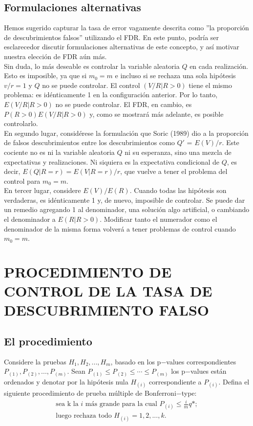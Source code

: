 \documentclass[11pt,letterpaper]{article}
\begin{document}
\subsection{Formulaciones alternativas} 
Hemos sugerido capturar la tasa de error vagamente descrita como ''la proporción de descubrimientos falsos'' utilizando el FDR. En este punto, podría ser esclarecedor discutir formulaciones alternativas de este concepto, y así motivar nuestra elección de FDR aún más.\\
Sin duda, lo más deseable es controlar la variable aleatoria $Q$ en cada realización. Esto es imposible, ya que si $m_0= m$ e incluso si se rechaza una sola hipótesis $v / r =1$ y $Q$ no se puede controlar. El control $(V / R|R> 0)$ tiene el mismo problema: es idénticamente 1 en la configuración anterior. Por lo tanto, $E(V / R|R> 0)$ no se puede controlar. El FDR, en cambio, es $P(R> 0)E (V / R|R> 0)$ y, como se mostrará más adelante, es posible controlarlo.\\
En segundo lugar, considérese la formulación que Soric (1989) dio a la proporción de falsos descubrimientos entre los descubrimientos como $Q'$ = $E (V) / r$. Este cociente no es ni la variable aleatoria $Q$ ni su esperanza, sino una mezcla de expectativas y realizaciones. Ni siquiera es la expectativa condicional de $Q$, es decir, $E(Q|R = r)=E(V|R = r) / r$, que vuelve a tener el problema del control para $m_0=m$.\\
En tercer lugar, considere $E (V) / E (R)$. Cuando todas las hipótesis son verdaderas, es idénticamente 1 y, de nuevo, imposible de controlar. Se puede dar un remedio agregando 1 al denominador, una solución algo artificial, o cambiando el denominador a $E(R | R> 0)$. Modificar tanto el numerador como el denominador de la misma forma volverá a tener problemas de control cuando $m_0 = m$.

\section{PROCEDIMIENTO DE CONTROL DE LA TASA DE DESCUBRIMIENTO FALSO}
\subsection{El procedimiento} 
Considere la pruebas $H_1, H_2, ..., H_m$, basado en los p$-$values correspondientes $P_{(1)}, P_{(2)},..., P_{(m)}$. Sean $P_{(1)}\leq P_{(2)}\leq \cdots \leq  P_{(m)}$ los p$-$values están ordenados y denotar por la hipótesis nula $H_{(i)}$ correspondiente a $P_{(i)}$. Defina el siguiente procedimiento de prueba múltiple de Bonferroni$-$type:\\
\begin{align}
 \text{sea k la $i$ más grande para la cual }P_{(i)}\leq \frac{i}{m}q*;\\
 \text{luego rechaza todo }H_{(i)} = 1, 2, ..., k.
\end{align} 
\end{document}

